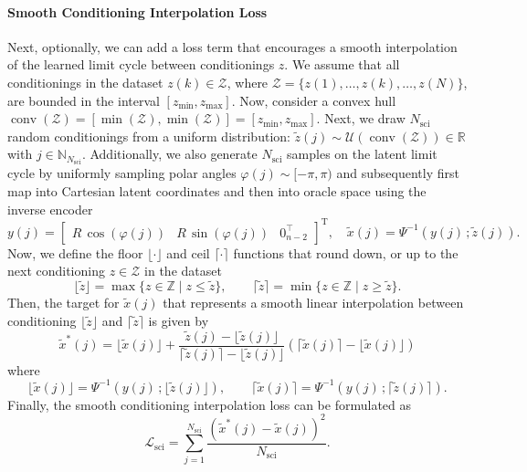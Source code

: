 \paragraph{Smooth Conditioning Interpolation Loss}
Next, optionally, we can add a loss term that encourages a smooth interpolation of the learned limit cycle between conditionings $z$. We assume that all conditionings in the dataset $z(k) \in \mathcal{Z}$, where $\mathcal{Z} = \{ z(1), \dots, z(k), \dots, z(N) \}$, are bounded in the interval $[z_\mathrm{min}, z_\mathrm{max}]$.
Now, consider a convex hull $\operatorname{conv}(\mathcal{Z}) = [\min(\mathcal{Z}), \min(\mathcal{Z})] = [z_\mathrm{min}, z_\mathrm{max}]$.
Next, we draw $N_\mathrm{sci}$ random conditionings from a uniform distribution: $\tilde{z}(j) \sim \mathcal{U}(\operatorname{conv}(\mathcal{Z})) \in \mathbb{R}$ with $j \in \mathbb{N}_{N_\mathrm{sci}}$.
Additionally, we also generate $N_\mathrm{sci}$ samples on the latent limit cycle by uniformly sampling polar angles $\varphi(j) \sim [-\pi, \pi)$ and subsequently first map into Cartesian latent coordinates and then into oracle space using the inverse encoder
\begin{equation}
    y(j) = \begin{bmatrix}
        R \, \cos(\varphi(j)) & R \, \sin(\varphi(j)) & 0_{n-2}^\top
    \end{bmatrix}^\mathrm{T},
    \quad
    \tilde{x}(j) = \Psi^{-1}(y(j) \, ; \tilde{z}(j)).
\end{equation}
Now, we define the floor $\lfloor \cdot \rfloor$ and ceil $\lceil \cdot \rceil$ functions that round down, or up to the next conditioning $z \in \mathcal{Z}$ in the dataset
\begin{equation}
    \lfloor \tilde{z} \rfloor = \max\{ z \in \mathbb{Z} \mid z \le \tilde{z} \},
    \qquad
    \lceil \tilde{z} \rceil = \min\{ z \in \mathbb{Z} \mid z \ge \tilde{z} \}.
\end{equation}
Then, the target for $\tilde{x}(j)$ that represents a smooth linear interpolation between conditioning $\lfloor \tilde{z} \rfloor $ and $\lceil \tilde{z} \rceil$ is given by
\begin{equation}
    \tilde{x}^*(j) = \lfloor \tilde{x}(j) \rfloor + \frac{\tilde{z}(j) - \lfloor \tilde{z}(j) \rfloor}{\lceil \tilde{z}(j) \rceil - \lfloor \tilde{z}(j) \rfloor} \left ( \lceil \tilde{x}(j) \rceil - \lfloor \tilde{x}(j) \rfloor \right )
\end{equation}
where
\begin{equation}
    \lfloor \tilde{x}(j) \rfloor = \Psi^{-1}(y(j) \, ; \lfloor \tilde{z}(j) \rfloor),
    \qquad
    \lceil \tilde{x}(j) \rceil = \Psi^{-1}(y(j) \, ; \lceil \tilde{z}(j) \rceil).
\end{equation}
Finally, the smooth conditioning interpolation loss can be formulated as
\begin{equation}
    \mathcal{L}_{\mathrm{sci}} = \sum_{j = 1}^{N_\mathrm{sci}} \frac{\left ( \tilde{x}^*(j) - \tilde{x}(j)\right )^2}{N_\mathrm{sci}}.
\end{equation}

